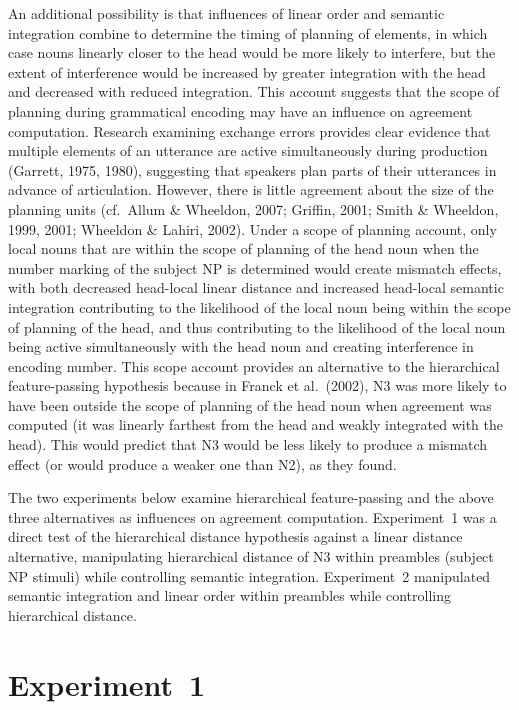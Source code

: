 \documentclass[12pt,titlepage]{article}
\begin{document}
An additional possibility is that influences of linear order and semantic
integration combine to determine the timing of planning of elements, in
which case nouns linearly closer to the head would be more likely to
interfere, but the extent of interference would be increased by greater
integration with the head and decreased with reduced integration.  This
account suggests that the scope of planning during grammatical encoding may
have an influence on agreement computation.  Research examining exchange
errors provides clear evidence that multiple elements of an utterance are
active simultaneously during production (Garrett, 1975, 1980), suggesting
that speakers plan parts of their utterances in advance of articulation.
However, there is little agreement about the size of the planning units
(cf.\ Allum \& Wheeldon, 2007; Griffin, 2001; Smith \& Wheeldon, 1999,
2001; Wheeldon \& Lahiri, 2002).  Under a scope of planning account, only
local nouns that are within the scope of planning of the head noun when the
number marking of the subject NP is determined would create mismatch
effects, with both decreased head-local linear distance and increased
head-local semantic integration contributing to the likelihood of the local
noun being within the scope of planning of the head, and thus contributing
to the likelihood of the local noun being active simultaneously with the
head noun and creating interference in encoding number.  This scope account
provides an alternative to the hierarchical feature-passing hypothesis
because in Franck et al.\ (2002), N3 was more likely to have been outside
the scope of planning of the head noun when agreement was computed (it was
linearly farthest from the head and weakly integrated with the head).  This
would predict that N3 would be less likely to produce a mismatch effect (or
would produce a weaker one than N2), as they found.

The two experiments below examine hierarchical feature-passing and the
above three alternatives as influences on agreement computation.
Experiment~1 was a direct test of the hierarchical distance hypothesis
against a linear distance alternative, manipulating hierarchical
distance of N3 within preambles (subject NP stimuli) while controlling
semantic integration.  Experiment~2 manipulated semantic integration and
linear order within preambles while controlling hierarchical distance.

\section[Experiment~1]{\center Experiment~1}
\end{document}

